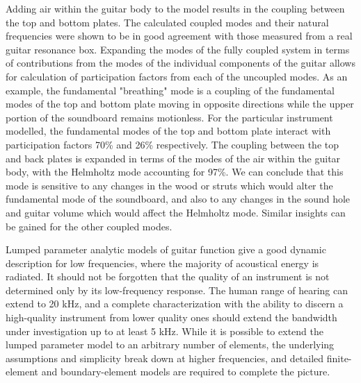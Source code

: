 \documentclass[
reprint,amsmath,amssymb,showpacs,citeautoscript,prb,twocolumn,notitlepage,floatfix
]{revtex4-1}
\begin{document}
Adding air within the guitar body to the model results in the coupling between the top and bottom plates. The calculated coupled modes and their natural frequencies were shown to be in good agreement with those measured from a real guitar resonance box. Expanding the modes of the fully coupled system in terms of contributions from the modes of the individual components of the guitar allows for calculation of participation factors from each of the uncoupled modes. As an example, the fundamental "breathing" mode is a coupling of the fundamental modes of the top and bottom plate moving in opposite directions while the upper portion of the soundboard remains motionless. For the particular instrument modelled, the fundamental modes of the top and bottom plate  interact with participation factors 70\% and 26\% respectively. The coupling between the top and back plates is expanded in terms of the modes of the air within the guitar body, with the Helmholtz mode accounting for 97\%.  We can conclude that this mode is sensitive to any changes in the wood or struts which would alter the fundamental mode of the soundboard, and also to any changes in the sound hole and guitar volume which would affect the Helmholtz mode. Similar insights can be gained for the other coupled modes.

Lumped parameter analytic models of guitar function give a good dynamic description for low frequencies, where the majority of acoustical energy is radiated. It should not be forgotten that the quality of an instrument is not determined only by its low-frequency response. The human range of hearing can extend to 20 kHz, and a complete characterization with the ability to discern a high-quality instrument from lower quality ones should extend the bandwidth under investigation up to at least 5 kHz\cite{CzajkowskaMarzena2012Aocg}. While it is possible to extend the lumped parameter model to an arbitrary number of elements, the underlying assumptions and simplicity break down at higher frequencies, and detailed finite-element and boundary-element models are required to complete the picture.


\nocite{*}

\end{document}

